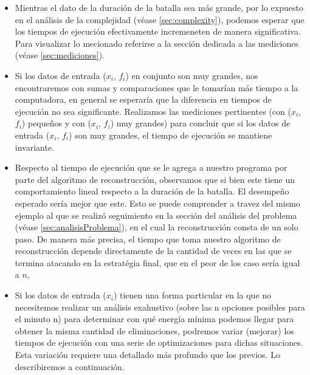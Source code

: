 \begin{itemize}
    \item Mientras el dato de la duración de la batalla sea más grande, por lo expuesto en el análisis de la complejidad (véase \ref{sec:complexity}), podemos esperar que los tiempos de ejecución efectivamente incremeneten de manera significativa. Para visualizar lo mecionado referirse a la sección dedicada a las mediciones (véase \ref{sec:mediciones}).
    \item Si los datos de entrada ($x_i$, $f_i$) en conjunto son muy grandes, nos encontraremos con sumas y comparaciones que le tomarían más tiempo a la computadora, en general se esperaría que la diferencia en tiempos de ejecución no sea significante. Realizamos las mediciones pertinentes (con ($x_i$, $f_i$) pequeños y con ($x_i$, $f_i$) muy grandes) para concluir que si los datos de entrada ($x_i$, $f_i$) son muy grandes, el tiempo de ejecución se mantiene invariante. 
    \item Respecto al tiempo de ejecución que se le agrega a nuestro programa por parte del algoritmo de reconstrucción, observamos que si bien este tiene un comportamiento lineal respecto a la duración de la batalla. El desempeño esperado sería mejor que este. Esto se puede comprender a travez del mismo ejemplo al que se realizó seguimiento en la sección del análisis del problema (véase \ref{sec:analisisProblema}), en el cual la reconstrucción consta de un solo paso. De manera más precisa, el tiempo que toma nuestro algoritmo de reconstrucción depende directamente de la cantidad de veces en las que se termina atacando en la estratégia final, que en el peor de los caso sería igual a $n$,

    \item Si los datos de entrada ($x_i$) tienen una forma particular en la que no necesitemos realizar un análisis exahustivo (sobre las n opciones posibles para el minuto n) para determinar con qué energía mínima podemos llegar para obtener la misma cantidad de eliminaciones, podremos variar (mejorar) los tiempos de ejecución con una serie de optimizaciones para dichas situaciones. Esta variación requiere una detallado más profundo que los previos. Lo describiremos a continuación.




\end{itemize}
